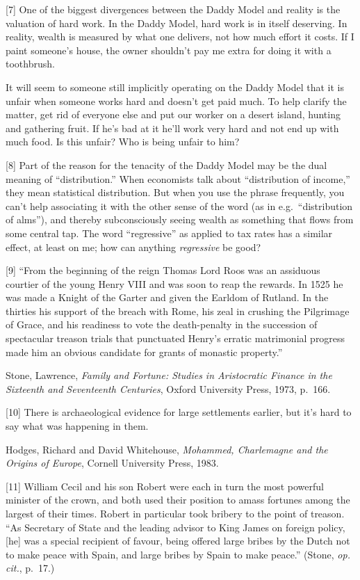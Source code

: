 {[}7{]} One of the biggest divergences between the Daddy Model and
reality is the valuation of hard work. In the Daddy Model, hard work is
in itself deserving. In reality, wealth is measured by what one
delivers, not how much effort it costs. If I paint someone's house, the
owner shouldn't pay me extra for doing it with a toothbrush.

It will seem to someone still implicitly operating on the Daddy Model
that it is unfair when someone works hard and doesn't get paid much. To
help clarify the matter, get rid of everyone else and put our worker on
a desert island, hunting and gathering fruit. If he's bad at it he'll
work very hard and not end up with much food. Is this unfair? Who is
being unfair to him?

{[}8{]} Part of the reason for the tenacity of the Daddy Model may be
the dual meaning of ``distribution.'' When economists talk about
``distribution of income,'' they mean statistical distribution. But when
you use the phrase frequently, you can't help associating it with the
other sense of the word (as in e.g.~``distribution of alms''), and
thereby subconsciously seeing wealth as something that flows from some
central tap. The word ``regressive'' as applied to tax rates has a
similar effect, at least on me; how can anything \emph{regressive} be
good?

{[}9{]} ``From the beginning of the reign Thomas Lord Roos was an
assiduous courtier of the young Henry VIII and was soon to reap the
rewards. In 1525 he was made a Knight of the Garter and given the
Earldom of Rutland. In the thirties his support of the breach with Rome,
his zeal in crushing the Pilgrimage of Grace, and his readiness to vote
the death-penalty in the succession of spectacular treason trials that
punctuated Henry's erratic matrimonial progress made him an obvious
candidate for grants of monastic property.''

Stone, Lawrence, \emph{Family and Fortune: Studies in Aristocratic
Finance in the Sixteenth and Seventeenth Centuries}, Oxford University
Press, 1973, p.~166.

{[}10{]} There is archaeological evidence for large settlements earlier,
but it's hard to say what was happening in them.

Hodges, Richard and David Whitehouse, \emph{Mohammed, Charlemagne and
the Origins of Europe}, Cornell University Press, 1983.

{[}11{]} William Cecil and his son Robert were each in turn the most
powerful minister of the crown, and both used their position to amass
fortunes among the largest of their times. Robert in particular took
bribery to the point of treason. ``As Secretary of State and the leading
advisor to King James on foreign policy, {[}he{]} was a special
recipient of favour, being offered large bribes by the Dutch not to make
peace with Spain, and large bribes by Spain to make peace.'' (Stone,
\emph{op. cit.}, p.~17.)

